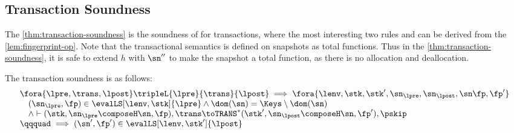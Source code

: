 \subsection{Transaction Soundness}

The \cref{thm:transaction-soundness} is the soundness of for transactions, where the most interesting two rules  and  can be derived from the \cref{lem:fingerprint-op}.
Note that the transactional semantics is defined on snapshots as total functions.
Thus in the \cref{thm:transaction-soundness}, it is safe to extend \( h \) with \( \sn'' \)  to make the snapshot a total function, as there is no allocation and deallocation.

\begin{theorem}
\label{thm:transaction-soundness}
The transaction soundness is as follows:
\[
    \begin{array}{@{}l@{}}
        \fora{ \lpre, \trans, \lpost } \tripleL{\lpre}{\trans}{\lpost}
        \implies 
        \fora{\lenv, \stk, \stk', \sn_\lpre, \sn_\lpost, \sn \fp, \fp' }  \\
        \quad (\sn_\lpre, \fp) \in \evalLS[\lenv, \stk]{\lpre}
        \land \dom(\sn) = \Keys \setminus \dom(\sn) \\
        \quad {} \land \vdash (\stk, \sn_\lpre \composeH \sn, \fp ), \trans \toTRANS^{*}  (\stk', \sn_\lpost \composeH \sn, \fp' ), \pskip  \\
        \qqquad \implies (\sn', \fp') \in \evalLS[\lenv, \stk']{\lpost}
    \end{array}
\]
\end{theorem}
